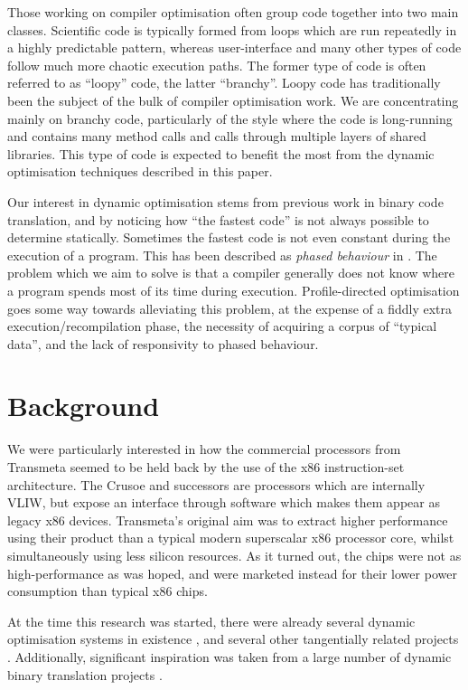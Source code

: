 \documentclass[11pt,letterpaper,twocolumn,notitlepage]{article}
\begin{document}
Those working on compiler optimisation often group code together into two main classes. Scientific code is typically formed from loops which are run repeatedly in a highly predictable pattern, whereas user-interface and many other types of code follow much more chaotic execution paths. The former type of code is often referred to as ``loopy'' code, the latter ``branchy''. Loopy code has traditionally been the subject of the bulk of compiler optimisation work. We are concentrating mainly on branchy code, particularly of the style where the code is long-running and contains many method calls and calls through multiple layers of shared libraries. This type of code is expected to benefit the most from the dynamic optimisation techniques described in this paper.

Our interest in dynamic optimisation stems from previous work in binary code translation, and by noticing how ``the fastest code'' is not always possible to determine statically. Sometimes the fastest code is not even constant during the execution of a program. This has been described as {\em phased behaviour} in \cite{WigginsRedstone}. The problem which we aim to solve is that a compiler generally does not know where a program spends most of its time during execution. Profile-directed optimisation goes some way towards alleviating this problem, at the expense of a fiddly extra execution/recompilation phase, the necessity of acquiring a corpus of ``typical data'', and the lack of responsivity to phased behaviour.

\section{Background}

We were particularly interested in how the commercial processors from Transmeta \cite{Transmeta} seemed to be held back by the use of the x86 instruction-set architecture. The Crusoe and successors are processors which are internally VLIW, but expose an interface through software which makes them appear as legacy x86 devices. Transmeta's original aim was to extract higher performance using their product than a typical modern superscalar x86 processor core, whilst simultaneously using less silicon resources. As it turned out, the chips were not as high-performance as was hoped, and were marketed instead for their lower power consumption than typical x86 chips.

At the time this research was started, there were already several dynamic optimisation systems in existence \cite{Dynamo,Mojo}, and several other tangentially related projects \cite{Spike,WigginsRedstone}. Additionally, significant inspiration was taken from a large number of dynamic binary translation projects \cite{Dixie,Embra,Deco,Etch,UQBT,Executor,Shade,armphetamine}.
\end{document}
